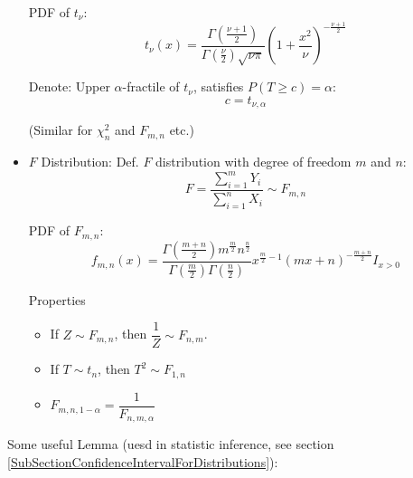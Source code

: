 \begin{itemize}
            PDF of $t_\nu$:
            \begin{equation}        t_\nu(x)=\dfrac{\Gamma(\frac{\nu+1}{2})}{\Gamma(\frac{\nu}{2})\sqrt{\nu\pi}}\left(1+\frac{x^2}{\nu}\right)^{-\frac{\nu+1}{2}}\end{equation}

            Denote: Upper $\alpha$-fractile of $t_\nu$, satisfies $P(T\geq c)=\alpha$:
            \begin{equation}        
                c=t_{\nu,\alpha}
            \end{equation}
            
            (Similar for $\chi^2_n$ and $F_{m,n}$ etc.)
            \item $F$ Distribution: Def. $F$ distribution with degree of freedom $m$ and $n$:
            \begin{equation}        
                F=\frac{\sum_{i=1}^mY_i}{\sum_{i=1}^nX_i}\sim F_{m,n}
            \end{equation}

            PDF of $F_{m,n}$:
            \begin{equation}        
                f_{m,n}(x)=\frac{\Gamma(\frac{m+n}{2})m^\frac{m}{2}n^{\frac{n}{2}}}{\Gamma(\frac{m}{2})\Gamma(\frac{n}{2})}x^{\frac{m}{2}-1}(mx+n)^{-\frac{m+n}{2}} I_{x>0}
            \end{equation}

            Properties
            \begin{itemize}
                \item If $Z\sim F_{m,n}$, then $\dfrac{1}{Z}\sim F_{n,m}$.
                \item If $T\sim t_n$, then $T^2\sim F_{1,n}$
                \item $F_{m,n,1-\alpha}=\dfrac{1}{F_{n,m,\alpha}}$
            \end{itemize}
        \end{itemize}

        \begin{point}
            Some useful Lemma (uesd in statistic inference, see section \ref{SubSectionConfidenceIntervalForDistributions}):
        \end{point}
        
